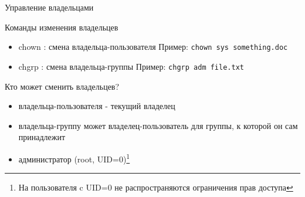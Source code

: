 \begin{frame}[fragile]{Управление владельцами}

  Команды изменения владельцев
  \begin{itemize} 
    \item \alert{chown} : смена владельца-пользователя \newline
      Пример: \verb+chown sys something.doc+
    \item \alert{chgrp} : смена владельца-группы \newline
      Пример: \verb+chgrp adm file.txt+
  \end{itemize} \pause

  Кто может сменить владельцев?
  \begin{itemize}
    \item владельца-пользователя  - текущий владелец
    \item владельца-группу может владелец-пользователь для группы, к которой он сам принадлежит
    \item  администратор (root, UID=0)\footnote{На пользователя c UID=0 не распространяются ограничения прав доступа} 
  \end{itemize} 
\end{frame}
